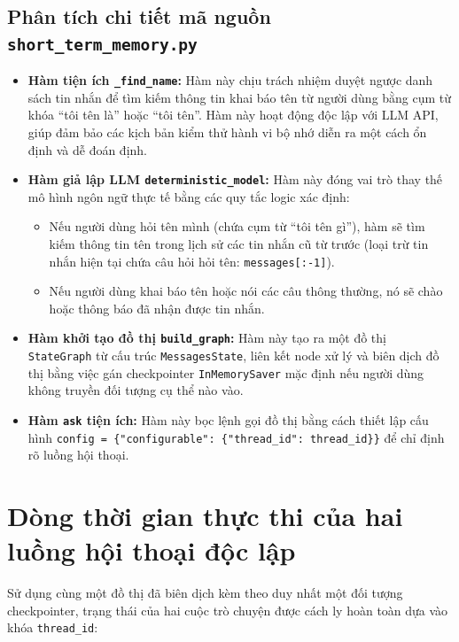 \begingroup

\endgroup

\subsection{Phân tích chi tiết mã nguồn \texttt{short\_term\_memory.py}}
\begin{itemize}
  \item \textbf{Hàm tiện ích \texttt{\_find\_name}:} Hàm này chịu trách nhiệm duyệt ngược danh sách tin nhắn để tìm kiếm thông tin khai báo tên từ người dùng bằng cụm từ khóa ``tôi tên là'' hoặc ``tôi tên''. Hàm này hoạt động độc lập với LLM API, giúp đảm bảo các kịch bản kiểm thử hành vi bộ nhớ diễn ra một cách ổn định và dễ đoán định.
  \item \textbf{Hàm giả lập LLM \texttt{deterministic\_model}:} Hàm này đóng vai trò thay thế mô hình ngôn ngữ thực tế bằng các quy tắc logic xác định:
  \begin{itemize}
    \item Nếu người dùng hỏi tên mình (chứa cụm từ ``tôi tên gì''), hàm sẽ tìm kiếm thông tin tên trong lịch sử các tin nhắn cũ từ trước (loại trừ tin nhắn hiện tại chứa câu hỏi hỏi tên: \texttt{messages[:-1]}).
    \item Nếu người dùng khai báo tên hoặc nói các câu thông thường, nó sẽ chào hoặc thông báo đã nhận được tin nhắn.
  \end{itemize}
  \item \textbf{Hàm khởi tạo đồ thị \texttt{build\_graph}:} Hàm này tạo ra một đồ thị \texttt{StateGraph} từ cấu trúc \texttt{MessagesState}, liên kết node xử lý và biên dịch đồ thị bằng việc gán checkpointer \texttt{InMemorySaver} mặc định nếu người dùng không truyền đối tượng cụ thể nào vào.
  \item \textbf{Hàm \texttt{ask} tiện ích:} Hàm này bọc lệnh gọi đồ thị bằng cách thiết lập cấu hình \texttt{config = \{"configurable": \{"thread\_id": thread\_id\}\}} để chỉ định rõ luồng hội thoại.
\end{itemize}

\section{Dòng thời gian thực thi của hai luồng hội thoại độc lập}

Sử dụng cùng một đồ thị đã biên dịch kèm theo duy nhất một đối tượng checkpointer, trạng thái của hai cuộc trò chuyện được cách ly hoàn toàn dựa vào khóa \texttt{thread\_id}:

